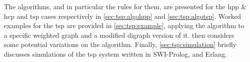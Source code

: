 The algorithms, and in particular the rules for them, are presented for the \gls{hpp} \& \gls{hcp} and \gls{tsp} cases respectively in \cref{sec:tsp:algohpp} and \cref{sec:tsp:algotsp}.  Worked examples for the \gls{tsp} are provided in \cref{sec:tsp:example}, applying the algorithm to a specific weighted graph and a modified digraph version of it.   then considers some potential variations on the algorithm.  Finally, \cref{sec:tsp:simulation} briefly discusses simulations of the \gls{tsp} system written in SWI-Prolog, \fsharp{} and Erlang.